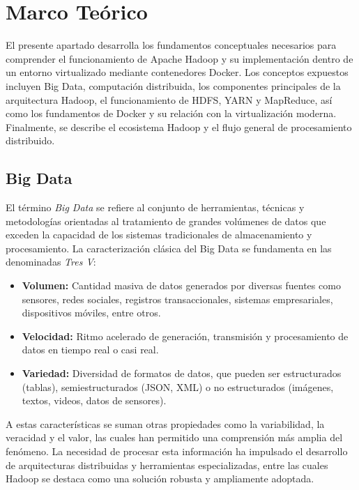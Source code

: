 \section{Marco Teórico}

El presente apartado desarrolla los fundamentos conceptuales necesarios para comprender el funcionamiento de Apache Hadoop y su implementación dentro de un entorno virtualizado mediante contenedores Docker. Los conceptos expuestos incluyen Big Data, computación distribuida, los componentes principales de la arquitectura Hadoop, el funcionamiento de HDFS, YARN y MapReduce, así como los fundamentos de Docker y su relación con la virtualización moderna. Finalmente, se describe el ecosistema Hadoop y el flujo general de procesamiento distribuido.

\subsection{Big Data}

El término \textit{Big Data} se refiere al conjunto de herramientas, técnicas y metodologías orientadas al tratamiento de grandes volúmenes de datos que exceden la capacidad de los sistemas tradicionales de almacenamiento y procesamiento. La caracterización clásica del Big Data se fundamenta en las denominadas \textit{Tres V}:

\begin{itemize}
    \item \textbf{Volumen:} Cantidad masiva de datos generados por diversas fuentes como sensores, redes sociales, registros transaccionales, sistemas empresariales, dispositivos móviles, entre otros.
    \item \textbf{Velocidad:} Ritmo acelerado de generación, transmisión y procesamiento de datos en tiempo real o casi real.
    \item \textbf{Variedad:} Diversidad de formatos de datos, que pueden ser estructurados (tablas), semiestructurados (JSON, XML) o no estructurados (imágenes, textos, videos, datos de sensores).
\end{itemize}

A estas características se suman otras propiedades como la variabilidad, la veracidad y el valor, las cuales han permitido una comprensión más amplia del fenómeno. La necesidad de procesar esta información ha impulsado el desarrollo de arquitecturas distribuidas y herramientas especializadas, entre las cuales Hadoop se destaca como una solución robusta y ampliamente adoptada.

